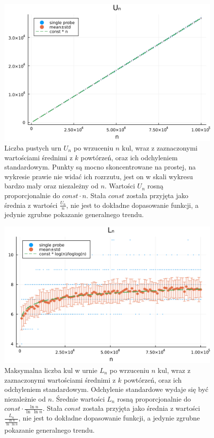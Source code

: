 \documentclass{article}
\begin{document}
\begin{figure}
    \centering
    \includegraphics[width=1.0\textwidth]{../results/U_n.png}
    \caption{Liczba pustych urn $U_n$ po wrzuceniu $n$ kul, wraz z zaznaczonymi wartościami średnimi z $k$ powtórzeń, oraz ich odchyleniem standardowym. Punkty są mocno skoncentrowane na prostej, na wykresie prawie nie widać ich rozrzutu, jest on w skali wykresu bardzo mały oraz niezależny od $n$. Wartości $U_n$ rosną proporcjonalnie do $const \cdot n$. Stała $const$ została przyjęta jako średnia z wartości $\frac{U_n}{n}$, nie jest to dokładne dopasowanie funkcji, a jedynie zgrubne pokazanie generalnego trendu.}
    \label{fig:U_n}
\end{figure}

\begin{figure}
    \centering
    \includegraphics[width=1.0\textwidth]{../results/L_n.png}
    \caption{Maksymalna liczba kul w urnie $L_n$ po wrzuceniu $n$ kul, wraz z zaznaczonymi wartościami średnimi z $k$ powtórzeń, oraz ich odchyleniem standardowym. Odchylenie standardowe wydaje się być niezależnie od $n$.
        Średnie wartości $L_n$ rosną proporcjonalnie do $const \cdot \frac{\ln n}{\ln\ \ln n}$. Stała $const$ została przyjęta jako średnia z wartości $\frac{L_n}{\frac{\ln n}{\ln\ \ln n}}$, nie jest to dokładne dopasowanie funkcji, a jedynie zgrubne pokazanie generalnego trendu.}
    \label{fig:L_n}
\end{figure}
\end{document}
